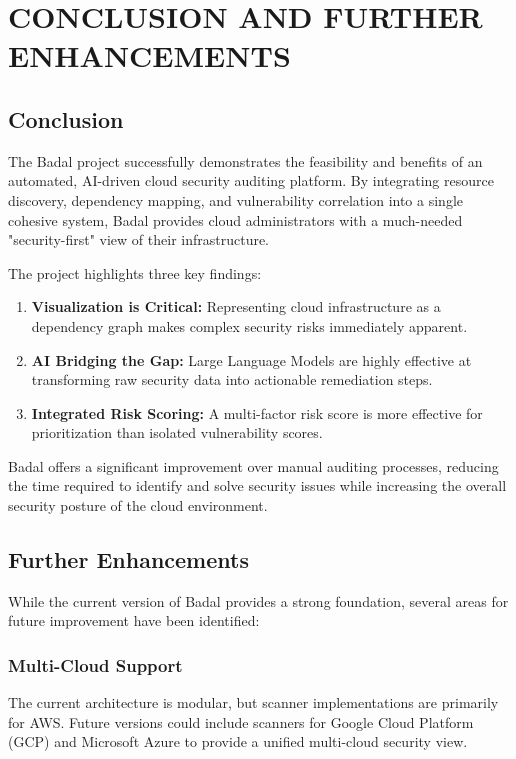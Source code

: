 \chapter{\MakeUppercase{Conclusion and Further enhancements}}

\section{Conclusion}
The Badal project successfully demonstrates the feasibility and benefits of an automated, AI-driven cloud security auditing platform. By integrating resource discovery, dependency mapping, and vulnerability correlation into a single cohesive system, Badal provides cloud administrators with a much-needed "security-first" view of their infrastructure.

The project highlights three key findings:
\begin{enumerate}
    \item \textbf{Visualization is Critical:} Representing cloud infrastructure as a dependency graph makes complex security risks immediately apparent.
    \item \textbf{AI Bridging the Gap:} Large Language Models are highly effective at transforming raw security data into actionable remediation steps.
    \item \textbf{Integrated Risk Scoring:} A multi-factor risk score is more effective for prioritization than isolated vulnerability scores.
\end{enumerate}

Badal offers a significant improvement over manual auditing processes, reducing the time required to identify and solve security issues while increasing the overall security posture of the cloud environment.

\section{Further Enhancements}
While the current version of Badal provides a strong foundation, several areas for future improvement have been identified:

\subsection{Multi-Cloud Support}
The current architecture is modular, but scanner implementations are primarily for AWS. Future versions could include scanners for Google Cloud Platform (GCP) and Microsoft Azure to provide a unified multi-cloud security view.

